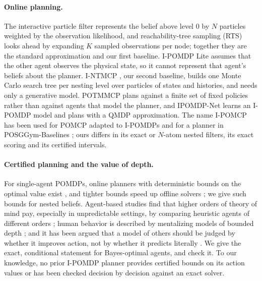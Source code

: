 \documentclass{article}
\begin{document}
\paragraph{Online planning.} The interactive particle filter \cite{doshi2009monte} represents the belief above level 0 by $N$ particles weighted by the observation likelihood, and reachability-tree sampling (RTS) looks ahead by expanding $K$ sampled observations per node; together they are the standard approximation and our first baseline. I-POMDP Lite \cite{hoang2013interactive} assumes that the other agent observes the physical state, so it cannot represent that agent's beliefs about the planner. I-NTMCP \cite{schwartz2022online}, our second baseline, builds one Monte Carlo search tree per nesting level over particles of states and histories, and needs only a generative model. POTMMCP \cite{schwartz2023combining} plans against a finite set of fixed policies rather than against agents that model the planner, and IPOMDP-Net \cite{han2019ipomdpnet} learns an I-POMDP model and plans with a QMDP approximation. The name I-POMCP has been used for POMCP adapted to I-POMDPs \cite{hula2015monte} and for a planner in POSGGym-Baselines \cite{schwartz2025posggym}; ours differs in its exact or $N$-atom nested filters, its exact scoring and its certified intervals.

\paragraph{Certified planning and the value of depth.} For single-agent POMDPs, online planners with deterministic bounds on the optimal value exist \cite{barenboim2023online}, and tighter bounds speed up offline solvers \cite{krale2025tighter}; we give such bounds for nested beliefs. Agent-based studies find that higher orders of theory of mind pay, especially in unpredictable settings, by comparing heuristic agents of different orders \cite{deweerd2013much,deweerd2017negotiating,deweerd2022higher}; human behavior is described by mentalizing models of bounded depth \cite{devaine2014social}; and it has been argued that a model of others should be judged by whether it improves action, not by whether it predicts literally \cite{riemer2025position}. We give the exact, conditional statement for Bayes-optimal agents, and check it. To our knowledge, no prior I-POMDP planner provides certified bounds on its action values or has been checked decision by decision against an exact solver.

\end{document}
